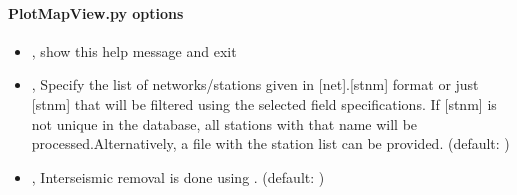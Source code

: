 \documentclass[letterpaper,10pt,english]{sphinxmanual}
\begin{document}
\paragraph{PlotMapView.py options}
\label{\detokenize{com:PlotMapView.py-options}}\begin{itemize}
\item {} 
\sphinxAtStartPar
{\hyperref[\detokenize{com:PlotMapView.py--h}]{}}, {\hyperref[\detokenize{com:PlotMapView.py---help}]{}} \sphinxhyphen{} show this help message and exit

\item {} 
\sphinxAtStartPar
{\hyperref[\detokenize{com:PlotMapView.py--stn}]{}} , {\hyperref[\detokenize{com:PlotMapView.py---stations}]{}}  \sphinxhyphen{} Specify the list of networks/stations given in {[}net{]}.{[}stnm{]} format or just {[}stnm{]} that will be filtered using the selected field specifications. If {[}stnm{]} is not unique in the database, all stations with that name will be processed.Alternatively, a file with the station list can be provided. (default: \sphinxcode{\sphinxupquote{{[}{]}}})

\item {} 
\sphinxAtStartPar
{\hyperref[\detokenize{com:PlotMapView.py--inter}]{}} , {\hyperref[\detokenize{com:PlotMapView.py---interseismic_model}]{}}  \sphinxhyphen{} Interseismic removal is done using . (default: )


\end{itemize}
\end{document}
